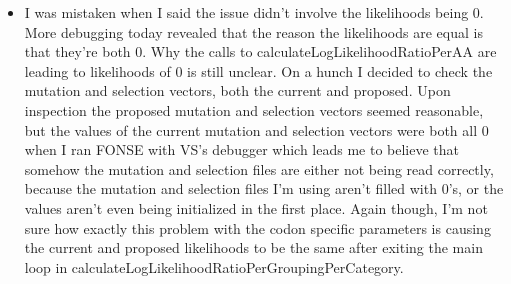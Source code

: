 \documentclass[11pt]{labbook}
\begin{document}
    \begin{itemize}
        \item I was mistaken when I said the issue didn't involve the likelihoods being 0. More debugging today revealed that the reason the likelihoods are equal is that they're both 0. Why the calls to calculateLogLikelihoodRatioPerAA are leading to likelihoods of 0 is still unclear. On a hunch I decided to check the mutation and selection vectors, both the current and proposed. Upon inspection the proposed mutation and selection vectors seemed reasonable, but the values of the current mutation and selection vectors were both all 0 when I ran FONSE with VS's debugger which leads me to believe that somehow the mutation and selection files are either not being read correctly, because the mutation and selection files I'm using aren't filled with 0's, or the values aren't even being initialized in the first place. Again though, I'm not sure how exactly this problem with the codon specific parameters is causing the current and proposed likelihoods to be the same after exiting the main loop in calculateLogLikelihoodRatioPerGroupingPerCategory.
    \end{itemize}
\end{document}
